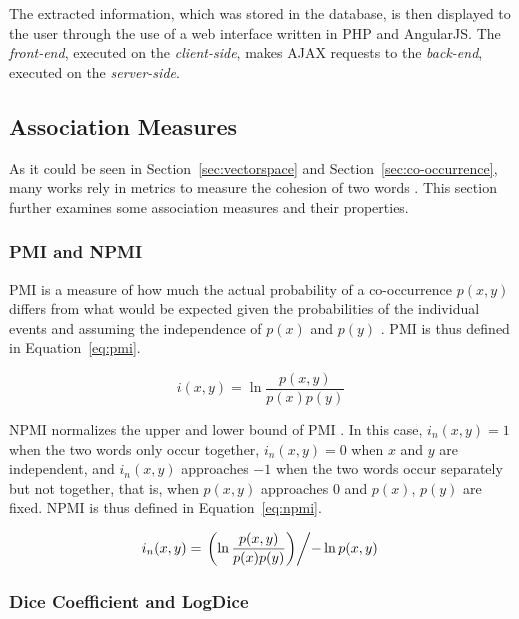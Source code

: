 The extracted information, which was stored in the database, is then displayed 
to the user through the use of a web interface written in \ac{PHP} and 
AngularJS. The \emph{front-end}, executed on the \emph{client-side}, makes 
\ac{AJAX} requests to the \emph{back-end}, executed on the \emph{server-side}.

\subsection{Association Measures}

As it could be seen in Section~\ref{sec:vectorspace} and
Section~\ref{sec:co-occurrence}, many works rely in metrics to measure the
cohesion of two words 
\citep{pantel2003clustering,pantel2002discovering,jurgens2010hermit,klapaftis2008word,korkontzelos2010uoy,correia2015syntax}.
This section further examines some association measures and their properties.

\subsubsection*{\acl*{PMI} and \acl*{NPMI}}
\label{subsec:pmi}

\ac{PMI} is a measure of how much the actual probability of a co-occurrence
$p(x,y)$ differs from what would be expected given the probabilities of the
individual events and assuming the independence of $p(x)$ and $p(y)$
\citep{church1990word}. \ac{PMI} is thus defined in Equation~\ref{eq:pmi}.

\begin{equation}
  \label{eq:pmi}
  i(x,y) = \ln \frac{p(x,y)}{p(x)p(y)}
\end{equation}

\ac{NPMI} normalizes the upper and lower bound of \ac{PMI} 
\citep{bouma2009normalized}.
In this case, $i_n(x,y) = 1$ when the two words only occur together,
$i_n(x,y) = 0$ when $x$ and $y$ are independent, and $i_n(x,y)$ approaches $-1$
when the two words occur separately but not together, that is, when $p(x,y)$
approaches 0 and $p(x)$, $p(y)$ are fixed. \ac{NPMI} is thus defined in
Equation~\ref{eq:npmi}.

\begin{equation}
  \label{eq:npmi}
  i_n(x,y) = \left. \left( \ln \frac{p(x,y)}{p(x)p(y)} \right) \middle/
             - \ln p(x,y) \right.
\end{equation}

\subsubsection*{Dice Coefficient and LogDice}
\label{subsec:dice}

